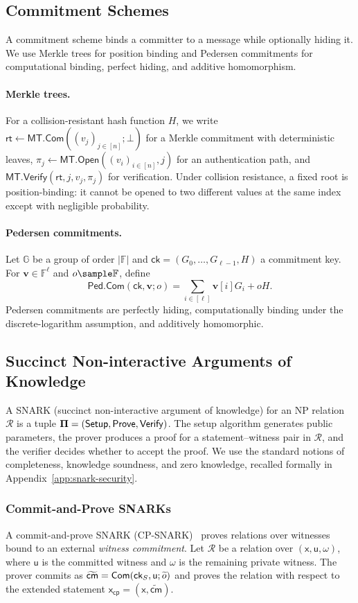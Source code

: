 \documentclass[conference,compsoc]{IEEEtran}
\newcommand{\cm}{\textsf{cm}}
\newcommand{\rt}{\textsf{rt}}
\newcommand{\merkleC}{\textsf{MT.Com}}
\newcommand{\merkleV}{\textsf{MT.Verify}}
\newcommand{\merkleO}{\textsf{MT.Open}}
\newcommand{\ck}{\textsf{ck}}
\newcommand{\pedC}{\textsf{Ped.Com}}
\newcommand{\vect}{\mathbf}         %
\newcommand{\bPi}{{\bf \Pi}}
\newcommand{\setup}{{\sf Setup}}
\newcommand{\com}{{\sf Com}}
\newcommand{\prove}{{\sf Prove}}
\renewcommand{\verify}{{\sf Verify}}
\newcommand{\relation}{{\mathcal{R}}}
\newcommand{\cp}{{\mathsf{cp}}}
\renewcommand{\ck}{{\textsf{ck}}}
\newcommand{\stmt}{\mathsf{x}}      %
\newcommand{\comwit}{\mathsf{u}}
\theoremstyle{plain}
\theoremstyle{definition}
\theoremstyle{remark}
\begin{document}
\subsection{Commitment Schemes}
\label{sec:prelim-commitments}

A commitment scheme binds a committer to a message while optionally hiding it.
We use Merkle trees for position binding and Pedersen commitments for
computational binding, perfect hiding, and additive homomorphism.

\paragraph{Merkle trees.}
For a collision-resistant hash function $H$, we write
$\rt\gets\merkleC((v_j)_{j\in[n]};\bot)$ for a Merkle commitment with
deterministic leaves, $\pi_j\gets\merkleO((v_i)_{i\in[n]},j)$ for an
authentication path, and $\merkleV(\rt,j,v_j,\pi_j)$ for verification.  Under
collision resistance, a fixed root is position-binding: it cannot be opened to
two different values at the same index except with negligible probability.

\paragraph{Pedersen commitments.}
Let $\mathbb{G}$ be a group of order $|\mathbb{F}|$ and
$\ck=(G_0,\ldots,G_{\ell-1},H)$ a commitment key.  For
$\vect{v}\in\mathbb{F}^{\ell}$ and $o\sample\mathbb{F}$, define
\[
  \pedC(\ck,\vect{v};o)
  =\sum_{i\in[\ell]}\vect{v}[i]G_i+oH.
\]
Pedersen commitments are perfectly hiding, computationally binding under the
discrete-logarithm assumption, and additively homomorphic.


\subsection{Succinct Non-interactive Arguments of Knowledge}
\label{sec:prelim-snark}

A SNARK (succinct non-interactive argument of knowledge) for an NP relation
$\relation$ is a tuple $\bPi=(\setup,\prove,\verify)$. The setup algorithm
generates public parameters, the prover produces a proof for a
statement--witness pair in $\relation$, and the verifier decides whether to
accept the proof. We use the standard notions of completeness, knowledge
soundness, and zero knowledge, recalled formally in
Appendix~\ref{app:snark-security}.


\subsubsection{Commit-and-Prove SNARKs}
A commit-and-prove SNARK (CP-SNARK)~\cite{gnark,legosnark} proves relations
over witnesses bound to an external \emph{witness commitment}. Let
\(\relation\) be a relation over \((\stmt,\comwit,\omega)\), where
\(\comwit\) is the committed witness and \(\omega\) is the remaining private
witness. The prover commits as
\(\widetilde{\cm}=\com(\ck_S,\comwit;\widetilde{o})\) and proves the relation
with respect to the extended statement
\(\stmt_{\cp}=(\stmt,\widetilde{\cm})\).
\end{document}
